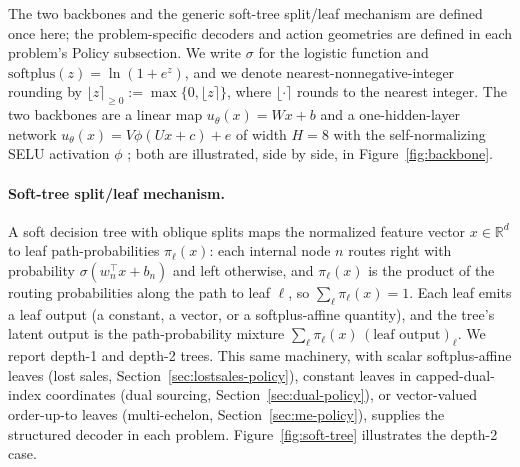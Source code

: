 \documentclass[11pt]{article}
\begin{document}
The two backbones and the generic soft-tree split/leaf mechanism are defined once here; the
problem-specific decoders and action geometries are defined in each problem's Policy subsection. We
write $\sigma$ for the logistic function and $\mathrm{softplus}(z)=\ln(1+e^{z})$, and we denote
nearest-nonnegative-integer rounding by $\lfloor z\rceil_{\ge 0} := \max\{0,\lfloor z\rceil\}$, where
$\lfloor\cdot\rceil$ rounds to the nearest integer. The two backbones are a linear map
$u_\theta(x)=Wx+b$ and a one-hidden-layer network $u_\theta(x)=V\phi(Ux+c)+e$ of width $H=8$ with the
self-normalizing SELU activation $\phi$ \citep{Klambauer2017Self}; both are illustrated, side by side,
in Figure~\ref{fig:backbone}.

\paragraph{Soft-tree split/leaf mechanism.}
\label{sec:soft-tree}
A soft decision tree with oblique splits maps the normalized feature vector $x\in\mathbb{R}^d$ to leaf
path-probabilities $\pi_\ell(x)$: each internal node $n$ routes right with probability
$\sigma(w_n^\top x + b_n)$ and left otherwise, and $\pi_\ell(x)$ is the product of the routing
probabilities along the path to leaf $\ell$, so $\sum_\ell \pi_\ell(x)=1$. Each leaf emits a leaf
output (a constant, a vector, or a softplus-affine quantity), and the tree's latent output is the
path-probability mixture $\sum_\ell \pi_\ell(x)\,(\text{leaf output})_\ell$. We report depth-1 and
depth-2 trees. This same machinery, with scalar softplus-affine leaves (lost sales,
Section~\ref{sec:lostsales-policy}), constant leaves in capped-dual-index coordinates (dual sourcing,
Section~\ref{sec:dual-policy}), or vector-valued order-up-to leaves (multi-echelon,
Section~\ref{sec:me-policy}), supplies the structured decoder in each problem.
Figure~\ref{fig:soft-tree} illustrates the depth-2 case.
\end{document}
